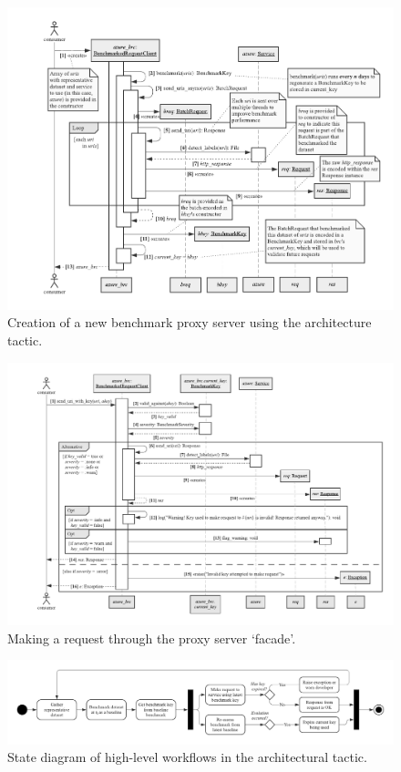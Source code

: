 {\begin{landscape}
\begin{figure}[p!]
\centering
\caption[Creation of a benchmark using the architecture tactic]{Creation of a new benchmark proxy server using the architecture tactic.}
\label{fig:additional:arch-create-new-brc}
\includegraphics[width=.8\linewidth,height=\paperheight,keepaspectratio]{appendix/figures/arch-create-new-brc}
\end{figure}

\begin{figure}[p!]
\centering
\caption[Making a request via the proxy server facade]{Making a request through the proxy server `facade'.}
\label{fig:additional:arch-make-request}
\includegraphics[width=.9\linewidth,height=\paperheight,keepaspectratio]{appendix/figures/arch-make-request}
\end{figure}

\begin{figure}[p!]
\centering
\caption[High-level workflow of the architectural tactic]{State diagram of high-level workflows in the architectural tactic.}
\label{fig:additional:arch-overall-state}
\includegraphics[width=\linewidth]{appendix/figures/arch-overall-state}
\end{figure}


\end{landscape}}
